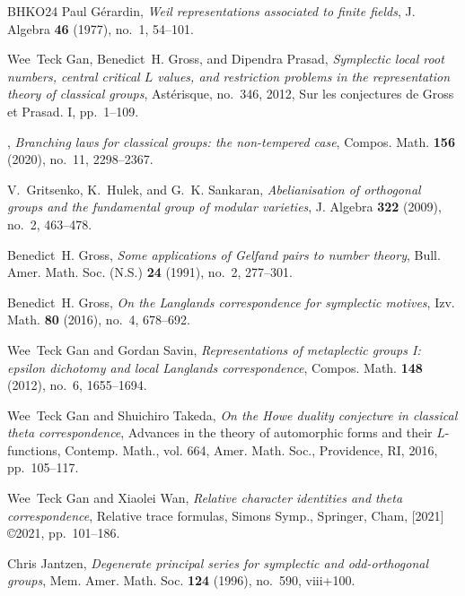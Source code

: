 \documentclass[12pt]{amsart}
\theoremstyle{definition}
\theoremstyle{remark}
\begin{document}
\begin{thebibliography}{BHKO24}
Paul G{\'{e}}rardin, \emph{Weil representations associated to finite fields},
  J. Algebra \textbf{46} (1977), no.~1, 54--101. 

Wee~Teck Gan, Benedict~H. Gross, and Dipendra Prasad, \emph{Symplectic local
  root numbers, central critical {$L$} values, and restriction problems in the
  representation theory of classical groups}, Ast{\'e}risque, no.~346, 2012, Sur les
  conjectures de Gross et Prasad. I, pp.~1--109. 

\bysame, \emph{Branching laws for classical groups: the non-tempered case},
  Compos. Math. \textbf{156} (2020), no.~11, 2298--2367. 

V.~Gritsenko, K.~Hulek, and G.~K. Sankaran, \emph{Abelianisation of orthogonal
  groups and the fundamental group of modular varieties}, J. Algebra
  \textbf{322} (2009), no.~2, 463--478. 

Benedict~H. Gross, \emph{Some applications of {G}elfand pairs to number
  theory}, Bull. Amer. Math. Soc. (N.S.) \textbf{24} (1991), no.~2, 277--301.

Benedict~H. Gross, \emph{On the {L}anglands correspondence for symplectic motives}, Izv. Math. \textbf{80} (2016), no.~4, 678--692.

Wee~Teck Gan and Gordan Savin, \emph{Representations of metaplectic groups {I}:
  epsilon dichotomy and local {L}anglands correspondence}, Compos. Math.
  \textbf{148} (2012), no.~6, 1655--1694. 

Wee~Teck Gan and Shuichiro Takeda, \emph{On the {H}owe duality conjecture in
  classical theta correspondence}, Advances in the theory of automorphic forms
  and their {$L$}-functions, Contemp. Math., vol. 664, Amer. Math. Soc.,
  Providence, RI, 2016, pp.~105--117. 

Wee~Teck Gan and Xiaolei Wan, \emph{Relative character identities and theta
  correspondence}, Relative trace formulas, Simons Symp., Springer, Cham,
  [2021] \copyright 2021, pp.~101--186. 

Chris Jantzen, \emph{Degenerate principal series for symplectic and
  odd-orthogonal groups}, Mem. Amer. Math. Soc. \textbf{124} (1996), no.~590,
  viii+100. 


\end{thebibliography}
\end{document}
